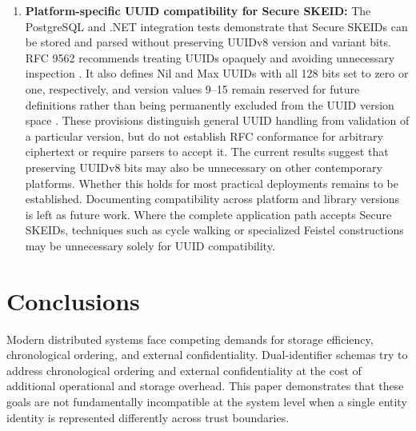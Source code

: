 \documentclass[a4paper,fleqn]{cas-sc}
\begin{document}
\begin{enumerate}
  release, containing algorithms, CDDL definitions, and test vectors.
  Formal IETF submission remains a separate dissemination step.
  Independent implementations in other languages would test the draft's
  interoperability through shared test vectors. Alternative bit
  allocations would require explicit trade-offs among timestamp
  precision, epoch duration, topology capacity, and sequence capacity,
  together with compatibility rules and validation.
\item
  \textbf{Platform-specific UUID compatibility for Secure SKEID:} The
  PostgreSQL and .NET integration tests demonstrate that Secure SKEIDs
  can be stored and parsed without preserving UUIDv8 version and variant
  bits. RFC 9562 recommends treating UUIDs opaquely and avoiding
  unnecessary inspection \citep[Section 6.12]{rfc9562}. It also defines
  Nil and Max UUIDs with all 128 bits set to zero or one, respectively,
  and version values 9--15 remain reserved for future definitions rather
  than being permanently excluded from the UUID version space
  \citep[Sections 4.2, 5.9, and 5.10]{rfc9562}. These provisions
  distinguish general UUID handling from validation of a particular
  version, but do not establish RFC conformance for arbitrary ciphertext
  or require parsers to accept it. The current results suggest that
  preserving UUIDv8 bits may also be unnecessary on other contemporary
  platforms. Whether this holds for most practical deployments remains
  to be established. Documenting compatibility across platform and
  library versions is left as future work. Where the complete
  application path accepts Secure SKEIDs, techniques such as cycle
  walking or specialized Feistel constructions \citep{khuong2022} may be
  unnecessary solely for UUID compatibility.
\end{enumerate}

\section{Conclusions}\label{conclusions}

Modern distributed systems face competing demands for storage
efficiency, chronological ordering, and external confidentiality.
Dual-identifier schemas try to address chronological ordering and
external confidentiality at the cost of additional operational and
storage overhead. This paper demonstrates that these goals are not
fundamentally incompatible at the system level when a single entity
identity is represented differently across trust boundaries.
\end{document}
